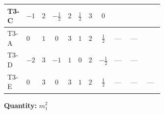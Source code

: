 \documentclass[8pt]{article}
\begin{document}
\begin{landscape}
\begin{longtable}{@{}llcccccc >{\raggedright\arraybackslash}p{0.21\linewidth} >{\raggedright\arraybackslash}p{0.21\linewidth} >{\raggedright\arraybackslash}p{0.21\linewidth}@{}}
\midrule
T3-C & $-1$ & $2$ & $-\frac{1}{2}$ & $2$ & $\frac{1}{2}$ & $3$ & $0$ & \scriptsize\adjustbox{max width=\linewidth}{$\begin{gathered} -\frac{9 {g_2}^2 {m_1^2}}{2}\end{gathered}$} & \scriptsize\adjustbox{max width=\linewidth}{$\begin{gathered} -\frac{3 {g_1}^2 {m_1^2}}{2}\end{gathered}$} & \scriptsize\adjustbox{max width=\linewidth}{$\begin{gathered} +4 {\lambda_{12}^{(1)}} {m_2^2}\end{gathered}$} \\
\midrule
T3-A & $0$ & $1$ & $0$ & $3$ & $1$ & $2$ & $\frac{1}{2}$ & --- & --- & \scriptsize\adjustbox{max width=\linewidth}{$\begin{gathered} +6 {\lambda_{12}^{(1)}} {m_2^2}\end{gathered}$} \\
\midrule
T3-D & $-2$ & $3$ & $-1$ & $1$ & $0$ & $2$ & $-\frac{1}{2}$ & --- & --- & \scriptsize\adjustbox{max width=\linewidth}{$\begin{gathered} +2 {\lambda_{12}^{(1)}} {m_2^2}\end{gathered}$} \\
\midrule
T3-E & $0$ & $3$ & $0$ & $3$ & $1$ & $2$ & $\frac{1}{2}$ & --- & --- & --- \\
\midrule
\bottomrule
\end{longtable}
\clearpage
\noindent\textbf{Quantity: }$m_1^2$\par\smallskip

\end{landscape}
\end{document}
